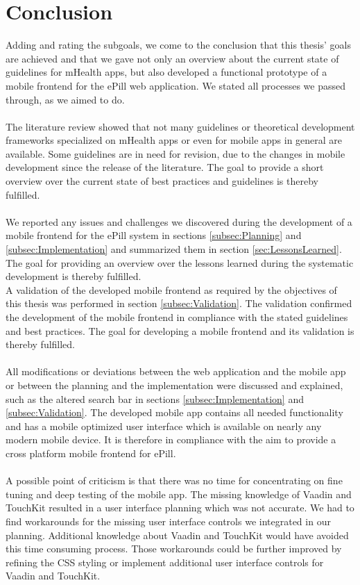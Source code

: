 \section{Conclusion}
Adding and rating the subgoals, we come to the conclusion that this thesis' goals are achieved and that we gave not only an overview about the current state of guidelines for mHealth apps, but also developed a functional prototype of a mobile frontend for the ePill web application. We stated all processes we passed through, as we aimed to do. 
\\
\\
The literature review showed that not many guidelines or theoretical development frameworks specialized on mHealth apps or even for mobile apps in general are available. Some guidelines are in need for revision, due to the changes in mobile development since the release of the literature. The goal to provide a short overview over the current state of best practices and guidelines is thereby fulfilled.
\\
\\
We reported any issues and challenges we discovered during the development of a mobile frontend for the ePill system in sections \ref{subsec:Planning} and \ref{subsec:Implementation} and summarized them in section \ref{sec:LessonsLearned}. The goal for providing an overview over the lessons learned during the systematic development is thereby fulfilled. 
\\
A validation of the developed mobile frontend as required by the objectives of this thesis was performed in section \ref{subsec:Validation}. The validation confirmed the development of the mobile frontend in compliance with the stated guidelines and best practices. The goal for developing a mobile frontend and its validation is thereby fulfilled.
\\
\\
All modifications or deviations between the web application and the mobile app or between the planning and the implementation were discussed and explained, such as the altered search bar in sections \ref{subsec:Implementation} and \ref{subsec:Validation}. The developed mobile app contains all needed functionality and has a mobile optimized user interface which is available on nearly any modern mobile device. It is therefore in compliance with the aim to provide a cross platform mobile frontend for ePill.
\\
\\
A possible point of criticism is that there was no time for concentrating on fine tuning and deep testing of the mobile app. The missing knowledge of Vaadin and TouchKit resulted in a user interface planning which was not accurate. We had to find workarounds for the missing user interface controls we integrated in our planning. Additional knowledge about Vaadin and TouchKit would have avoided this time consuming process. Those workarounds could be further improved by refining the CSS styling or implement additional user interface controls for Vaadin and TouchKit.
